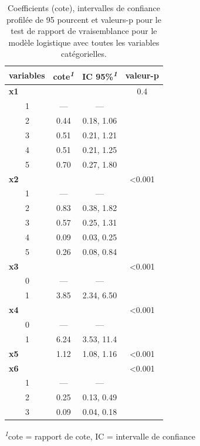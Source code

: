\documentclass[
  11pt,
  letterpaper,
]{scrbook}
\theoremstyle{definition}
\theoremstyle{remark}
\begin{document}
\hypertarget{tbl-logit1-complet}{}
\setlength{\LTpost}{0mm}
\begin{longtable}{lccc}
\caption{\label{tbl-logit1-complet}Coefficients (cote), intervalles de confiance profilée de 95 pourcent et
valeurs-p pour le test de rapport de vraisemblance pour le modèle
logistique avec toutes les variables catégorielles. }\tabularnewline

\toprule
variables & cote\textsuperscript{\textit{1}} & IC 95\%\textsuperscript{\textit{1}} & valeur-p \\ 
\midrule\addlinespace[2.5pt]
\textbf{x1} &  &  & 0.4 \\ 
    1 & — & — &  \\ 
    2 & 0.44 & 0.18, 1.06 &  \\ 
    3 & 0.51 & 0.21, 1.21 &  \\ 
    4 & 0.51 & 0.21, 1.25 &  \\ 
    5 & 0.70 & 0.27, 1.80 &  \\ 
\textbf{x2} &  &  & <0.001 \\ 
    1 & — & — &  \\ 
    2 & 0.83 & 0.38, 1.82 &  \\ 
    3 & 0.57 & 0.25, 1.31 &  \\ 
    4 & 0.09 & 0.03, 0.25 &  \\ 
    5 & 0.26 & 0.08, 0.84 &  \\ 
\textbf{x3} &  &  & <0.001 \\ 
    0 & — & — &  \\ 
    1 & 3.85 & 2.34, 6.50 &  \\ 
\textbf{x4} &  &  & <0.001 \\ 
    0 & — & — &  \\ 
    1 & 6.24 & 3.53, 11.4 &  \\ 
\textbf{x5} & 1.12 & 1.08, 1.16 & <0.001 \\ 
\textbf{x6} &  &  & <0.001 \\ 
    1 & — & — &  \\ 
    2 & 0.25 & 0.13, 0.49 &  \\ 
    3 & 0.09 & 0.04, 0.18 &  \\ 
\bottomrule
\end{longtable}
\begin{minipage}{\linewidth}
\textsuperscript{\textit{1}}cote = rapport de cote, IC = intervalle de confiance\\
\end{minipage}
\end{document}
